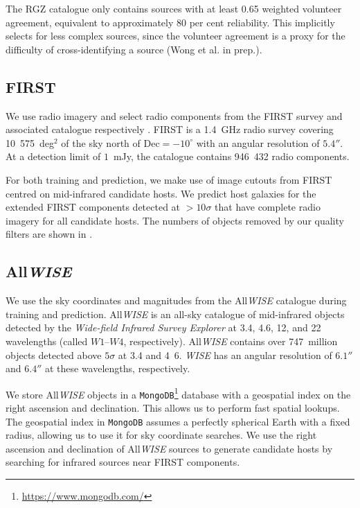     The RGZ catalogue only contains sources with at least 0.65 weighted volunteer agreement, equivalent to approximately 80 per cent reliability. This implicitly selects for less complex sources, since the volunteer agreement is a proxy for the difficulty of cross-identifying a source (Wong et al. in prep.).

    \subsection{FIRST} \label{sec:rlfs-first-data}

    We use radio imagery and select radio components from the FIRST survey and associated catalogue respectively \citep{white97first,helfand15first}. FIRST is a
    1.4~GHz radio survey covering 10~575~deg$^2$ of the sky north of $\mathrm{Dec} = -10^\circ$ with an angular resolution of $5.4''$. At a detection limit of $1$~mJy, the catalogue contains 946~432 radio components.

    For both training and prediction, we make use of image cutouts from FIRST centred on mid-infrared candidate hosts. We predict host galaxies for the \ncomponents{} extended FIRST components detected at $>10\sigma$ \citep[about 1.5~mJy~beam$^{-1}$, per][]{banfield15} that have complete radio imagery for all candidate hosts. The numbers of objects removed by our quality filters are shown in .

    \subsection{All\emph{WISE}} \label{sec:rlfs-wise-data}

    We use the sky coordinates and magnitudes from the All\emph{WISE} \citep{cutri2013wiseexplanatory} catalogue during training and prediction. All\emph{WISE} is an all-sky catalogue of mid-infrared objects detected by the \emph{Wide-field Infrared Survey Explorer} \citep[\emph{WISE}][]{wright10wise} at 3.4, 4.6, 12, and \unit{22}{\micro\meter} wavelengths (called $W1$--$W4$, respectively). All\emph{WISE}
    contains over 747~million objects detected above $5\sigma$ at 3.4 and
    \unit{4.6}{\micro\meter}. \emph{WISE} has an angular resolution of
    $6.1''$ and $6.4''$ at these wavelengths, respectively.

    We store All\emph{WISE} objects in a
    \texttt{MongoDB}\footnote{\url{https://www.mongodb.com/}} database with
    a geospatial index on the right ascension and declination. This allows
    us to perform fast spatial lookups. The geospatial index in
    \texttt{MongoDB} assumes a perfectly spherical Earth with a fixed radius, allowing us to use it for sky coordinate
    searches. We use the right ascension and declination of All\emph{WISE} sources to generate candidate hosts by searching for infrared sources near FIRST components.

